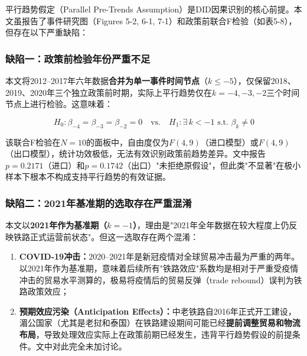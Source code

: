 \documentclass[12pt, a4paper]{article}
\begin{document}
\begin{criticalbox}

平行趋势假定（Parallel Pre-Trends Assumption）是DID因果识别的核心前提。本文虽报告了事件研究图（Figures 5-2, 6-1, 7-1）和政策前联合F检验（如表5-8），但存在以下严重缺陷：

\subsubsection{缺陷一：政策前检验年份严重不足}

本文将2012--2017年六年数据\textbf{合并为单一事件时间节点}（$k \leq -5$），仅保留2018、2019、2020年三个独立政策前时期，实际上平行趋势仅在$k = -4, -3, -2$三个时间节点上进行检验。这意味着：

\begin{equation}
  H_0: \beta_{-4} = \beta_{-3} = \beta_{-2} = 0 \quad \text{vs.} \quad H_1: \exists \, k < -1 \text{ s.t. } \beta_k \neq 0
  \label{eq:parallel_h0}
\end{equation}

该联合F检验在$N=10$的面板中，自由度仅为$F(4, 9)$（进口模型）或$F(4, 9)$（出口模型），统计功效极低，无法有效识别政策前趋势差异。文中报告$p = 0.2171$（进口）和$p = 0.1742$（出口）"未拒绝原假设"，但此类"不显著"在极小样本下根本不构成支持平行趋势的有效证据。

\subsubsection{缺陷二：2021年基准期的选取存在严重混淆}

本文以\textbf{2021年作为基准期（$k=-1$）}，理由是"2021年全年数据在较大程度上仍反映铁路正式运营前状态"。但这一选取存在两个混淆：

\begin{enumerate}[label=(\alph*)]
  \item \textbf{COVID-19冲击：}2020--2021年是新冠疫情对全球贸易冲击最为严重的两年。以2021年作为基准期，意味着后续所有"铁路效应"系数均是相对于严重受疫情冲击的贸易水平测算的，极易将疫情后的贸易反弹（trade rebound）误判为铁路政策效应；

  \item \textbf{预期效应污染（Anticipation Effects）：}中老铁路自2016年正式开工建设，湄公国家（尤其是老挝和泰国）在铁路建设期间可能已经\textbf{提前调整贸易和物流布局}，导致处理效应实际上在政策前期已经发生，违背平行趋势假设的前提条件。文中对此完全未加讨论。
\end{enumerate}


\end{criticalbox}
\end{document}
